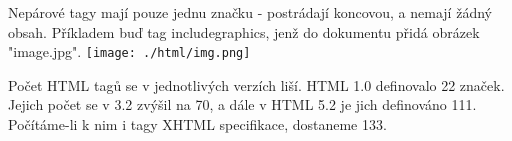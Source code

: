 \documentclass[main.tex]{subfiles}
\begin{document}
Nepárové tagy mají pouze jednu značku - postrádají koncovou, a nemají žádný obsah. Příkladem buď tag includegraphics, jenž do dokumentu přidá obrázek "image.jpg".
\texttt{[image: ./html/img.png]}

Počet HTML tagů se v jednotlivých verzích liší. HTML 1.0 definovalo 22 značek. Jejich počet se v 3.2 zvýšil na 70, a dále v HTML 5.2 je jich definováno 111. Počítáme-li k nim i tagy XHTML specifikace, dostaneme 133. \cite{web:en:counting_html}
\end{document}
